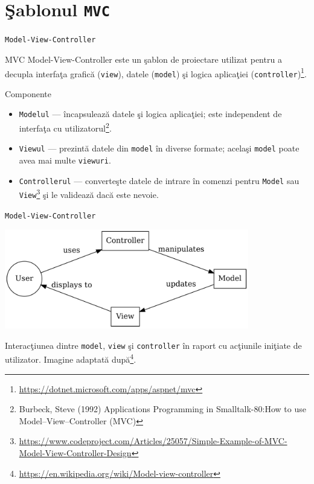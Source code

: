 \documentclass[presentation]{beamer}
\begin{document}
\section{Şablonul \texttt{MVC}}
\label{sec:orgf4cc7b4}
\begin{frame}[label={sec:orgaf6ae93},fragile]{\texttt{Model-View-Controller}}
 \begin{block}{MVC}
\alert{Model-View-Controller} este un şablon de proiectare utilizat pentru a decupla interfaţa grafică (\texttt{view}), datele (\texttt{model}) şi logica aplicaţiei (\texttt{controller})\footnote{\url{https://dotnet.microsoft.com/apps/aspnet/mvc}}.
\end{block}
\end{frame}
\begin{frame}[label={sec:orgb999d76},fragile]{Componente}
 \begin{itemize}
\item \texttt{Modelul} --- încapsulează datele şi logica aplicaţiei; este independent de interfaţa cu utilizatorul\footnote{Burbeck, Steve (1992) Applications Programming in Smalltalk-80:How to use Model–View–Controller (MVC)}.
\item \texttt{Viewul} --- prezintă datele din \texttt{model} în diverse formate; acelaşi \texttt{model} poate avea mai multe \texttt{viewuri}.
\item \texttt{Controllerul} --- converteşte datele de intrare în comenzi pentru \texttt{Model} sau \texttt{View}\footnote{\url{https://www.codeproject.com/Articles/25057/Simple-Example-of-MVC-Model-View-Controller-Design}} şi le validează dacă este nevoie.
\end{itemize}
\end{frame}
\begin{frame}[label={sec:orgaf78339},fragile]{\texttt{Model-View-Controller}}
 \begin{center}
\includegraphics[width=0.8\textwidth]{./img/diagrama-mvc.png}
\end{center}

\tiny
Interacţiunea dintre \texttt{model}, \texttt{view} şi \texttt{controller} în raport cu acţiunile iniţiate de utilizator.
Imagine adaptată după\footnote{\url{https://en.wikipedia.org/wiki/Model-view-controller}}.
\end{frame}
\end{document}
